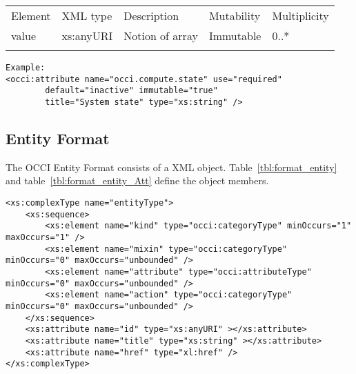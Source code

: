 \documentclass[10pt,a4paper]{article}
\begin{document}
 {
    \begin{tabularx}{\textwidth}{llXll}
    \toprule
    Element & XML type & Description & Mutability & Multiplicity \\
    \colrule
    value & xs:anyURI & Notion of array & Immutable & 0..* \\
    \botrule
    \end{tabularx}
}
\FloatBarrier

\begin{lstlisting}
Example:
<occi:attribute name="occi.compute.state" use="required"
		default="inactive" immutable="true"
		title="System state" type="xs:string" />
\end{lstlisting}

\subsection{Entity Format}
\label{sec:format_entity}

The OCCI Entity Format consists of a XML object.
Table~\ref{tbl:format_entity} and table~\ref{tbl:format_entity_Att} define the object members.

\begin{lstlisting}
<xs:complexType name="entityType">
	<xs:sequence>
		<xs:element name="kind" type="occi:categoryType" minOccurs="1" maxOccurs="1" />
		<xs:element name="mixin" type="occi:categoryType" minOccurs="0" maxOccurs="unbounded" />
		<xs:element name="attribute" type="occi:attributeType" minOccurs="0" maxOccurs="unbounded" />
		<xs:element name="action" type="occi:categoryType" minOccurs="0" maxOccurs="unbounded" />
	</xs:sequence>
	<xs:attribute name="id" type="xs:anyURI" ></xs:attribute>
	<xs:attribute name="title" type="xs:string" ></xs:attribute>
	<xs:attribute name="href" type="xl:href" />
</xs:complexType>
\end{lstlisting}
\end{document}
